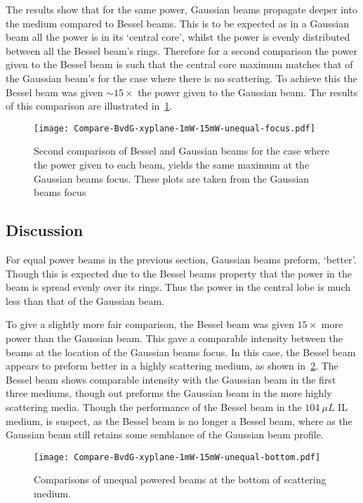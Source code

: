 The results show that for the same power, Gaussian beams propagate deeper into the medium compared to Bessel beams.
This is to be expected as in a Gaussian beam all the power is in its `central core', whilst the power is evenly distributed between all the Bessel beam's rings.
Therefore for a second comparison the power given to the Bessel beam is such that the central core maximum matches that of the Gaussian beam's for the case where there is no scattering.
To achieve this the Bessel beam was given $\sim 15\times$ the power given to the Gaussian beam.
The results of this comparison are illustrated in~\cref{fig:2ndcomp}.

\begin{figure}[!ht]
    \centering
    \texttt{[image: Compare-BvdG-xyplane-1mW-15mW-unequal-focus.pdf]}
    \caption{Second comparison of Bessel and Gaussian beams for the case where the power given to each beam, yields the same maximum at the Gaussian beams focus. These plots are taken from the Gaussian beams focus}
    \label{fig:2ndcomp}
\end{figure}


\subsection{Discussion}

For equal power beams in the previous section, Gaussian beams preform, `better'.
Though this is expected due to the Bessel beams property that the power in the beam is spread evenly over its rings.
Thus the power in the central lobe is much less than that of the Gaussian beam.

To give a slightly more fair comparison, the Bessel beam was given $15\times$ more power than the Gaussian beam.
This gave a comparable intensity between the beams at the location of the Gaussian beams focus.
In this case, the Bessel beam appears to preform better in a highly scattering medium, as shown in~\cref{fig:2ncompbottom}.
The Bessel beam shows comparable intensity with the Gaussian beam in the first three mediums, though out preforms the Gaussian beam in the more highly scattering media.
Though the performance of the Bessel beam in the $104~\mu L$ IL medium, is suspect, as the Bessel beam is no longer a Bessel beam, where as the Gaussian beam still retains some semblance of the Gaussian beam profile.

\begin{figure}[!htp]
    \centering
    \texttt{[image: Compare-BvdG-xyplane-1mW-15mW-unequal-bottom.pdf]}
    \caption{Comparisons of unequal powered beams at the bottom of scattering medium.}
    \label{fig:2ncompbottom}
\end{figure}

